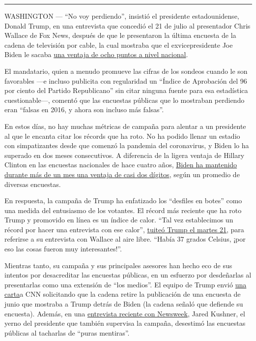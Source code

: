 \begin{center}\rule{0.5\linewidth}{\linethickness}\end{center}

WASHINGTON --- ``No voy perdiendo'', insistió el presidente
estadounidense, Donald Trump, en una entrevista que concedió el 21 de
julio al presentador Chris Wallace de Fox News, después de que le
presentaron la última encuesta de la cadena de televisión por cable, la
cual mostraba que el exvicepresidente Joe Biden le sacaba
\href{https://www.foxnews.com/politics/fox-news-poll-biden-holds-lead-over-trump-as-coronavirus-concerns-grip-nation}{una
ventaja de ocho puntos a nivel nacional}.

El mandatario, quien a menudo promueve las cifras de los sondeos cuando
le son favorables ---e incluso publicita con regularidad un ``Índice de
Aprobación del 96 por ciento del Partido Republicano'' sin citar ninguna
fuente para esa estadística cuestionable---, comentó que las encuestas
públicas que lo mostraban perdiendo eran ``falsas en 2016, y ahora son
incluso más falsas''.

En estos días, no hay muchas métricas de campaña para alentar a un
presidente al que le encanta citar los récords que ha roto. No ha podido
llenar un estadio con simpatizantes desde que comenzó la pandemia del
coronavirus, y Biden lo ha superado en dos meses consecutivos. A
diferencia de la ligera ventaja de Hillary Clinton en las encuestas
nacionales de hace cuatro años,
\href{https://www.nytimes.com/2020/07/20/upshot/biden-trump-poll.html?smid=tw-share}{Biden
ha mantenido durante más de un mes una ventaja de casi dos dígitos},
según un promedio de diversas encuestas.

En respuesta, la campaña de Trump ha enfatizado los ``desfiles en
botes'' como una medida del entusiasmo de los votantes. El récord más
reciente que ha roto Trump y promovido en línea es un índice de calor.
``Tal vez establecimos un récord por hacer una entrevista con ese
calor'',
\href{https://twitter.com/realDonaldTrump/status/1285520211593105413}{tuiteó
Trump el martes 21}, para referirse a su entrevista con Wallace al aire
libre. ``Había 37 grados Celsius, ¡por eso las cosas fueron muy
interesantes!''.

Mientras tanto, su campaña y sus principales asesores han hecho eco de
sus intentos por desacreditar las encuestas públicas, en un esfuerzo por
desdeñarlas al presentarlas como una extensión de ``los medios''. El
equipo de Trump envió
\href{https://edition.cnn.com/2020/06/10/politics/trump-campaign-cnn-poll/index.html}{una
carta}a CNN solicitando que la cadena retire la publicación de una
encuesta de junio que mostraba a Trump detrás de Biden (la cadena señaló
que defiende su encuesta). Además, en una
\href{https://www.newsweek.com/2020/07/24/exclusive-jared-kushner-gets-candid-about-struggling-trump-campaign-mideast-peace-more-1518952.html}{entrevista
reciente con Newsweek}, Jared Kushner, el yerno del presidente que
también supervisa la campaña, desestimó las encuestas públicas al
tacharlas de ``puras mentiras''.

